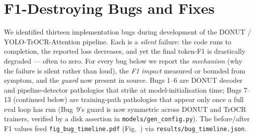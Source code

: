\section{F1-Destroying Bugs and Fixes}
\label{sec:bugs}
\sloppy  %

We identified thirteen implementation bugs during development of the
DONUT / YOLO-TrOCR-Attention pipeline.  Each is a \emph{silent}
failure: the code runs to completion, the reported loss decreases,
and yet the final token-F1 is drastically degraded --- often to
zero.  For every bug below we report the \emph{mechanism} (why the
failure is silent rather than loud), the \emph{F1 impact} measured
or bounded from symptom, and the \emph{guard} now present in source.
Bugs 1--6 are DONUT decoder and pipeline-detector pathologies that
strike at model-initialisation time; Bugs 7--13 (continued below)
are training-path pathologies that
appear only once a full eval loop has run (Bug~9's guard is now
symmetric across DONUT and TrOCR trainers, verified by a disk
assertion in \texttt{models/gen\_config.py}).  The before/after F1
values feed \texttt{fig\_bug\_timeline.pdf}
(Fig.~) via
\texttt{results/bug\_timeline.json}.

